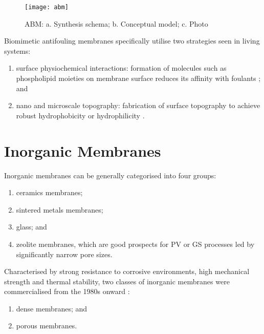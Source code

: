 \documentclass[a4paper,12pt]{report}
\begin{document}
\begin{figure}[h!]
\centering
  \texttt{[image: abm]}
  \caption{ABM: a. Synthesis schema; b. Conceptual model; c. Photo }
  \label{abm}
\end{figure}

Biomimetic antifouling membranes specifically utilise two strategies seen in living systems: 
\begin{enumerate}
\item surface physiochemical interactions: formation of molecules such as phospholipid moieties on membrane surface reduces its affinity with foulants \citep{47hua}; and
\item nano and microscale topography: fabrication of surface topography to achieve robust hydrophobicity or hydrophilicity \citep{48lia}.
\end{enumerate}


\section{Inorganic Membranes}

Inorganic membranes can be generally categorised into four groups: 
\begin{enumerate}
\item ceramics membranes;
\item sintered metals membranes;
\item glass; and
\item zeolite membranes, which are good prospects for PV or GS processes led by significantly narrow pore sizes.
\end{enumerate}

Characterised by strong resistance to corrosive environments, high mechanical strength and thermal stability, two classes of inorganic membranes were commercialised from the 1980s onward \citep{96mik}: 
\begin{enumerate}
\item dense membranes; and 
\item porous membranes.
\end{enumerate} 
\end{document}
